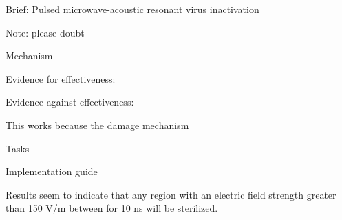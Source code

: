 \documentclass[fleqn,10pt]{article}
\begin{document}
Brief: Pulsed microwave-acoustic resonant virus inactivation

Note: please doubt

Mechanism

Evidence for effectiveness:



Evidence against effectiveness:

This works because the damage mechanism 

Tasks

Implementation guide

Results seem to indicate that any region with an electric field strength greater than 150 V/m between for 10 ns will be sterilized.
\end{document}
